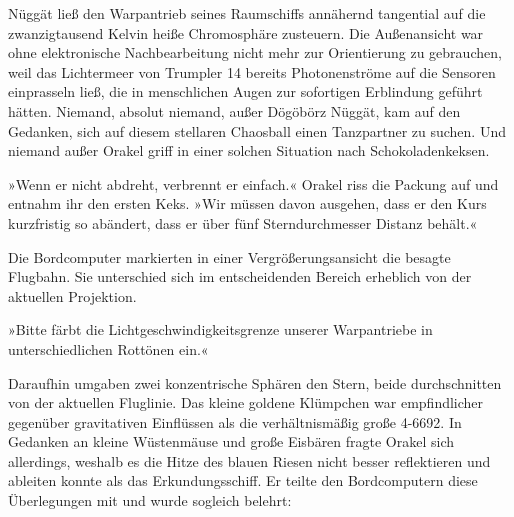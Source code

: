 Nüggät ließ den Warpantrieb seines Raumschiffs annähernd tangential auf die zwanzigtausend Kelvin heiße Chromosphäre zusteuern. Die Außenansicht war ohne elektronische Nachbearbeitung nicht mehr zur Orientierung zu gebrauchen, weil das Lichtermeer von Trumpler 14 bereits Photonenströme auf die Sensoren einprasseln ließ, die in menschlichen Augen zur sofortigen Erblindung geführt hätten. Niemand, absolut niemand, außer Dögöbörz Nüggät, kam auf den Gedanken, sich auf diesem stellaren Chaosball einen Tanzpartner zu suchen. Und niemand außer Orakel griff in einer solchen Situation nach Schokoladenkeksen.

»Wenn er nicht abdreht, verbrennt er einfach.« Orakel riss die Packung auf und entnahm ihr den ersten Keks. »Wir müssen davon ausgehen, dass er den Kurs kurzfristig so abändert, dass er über fünf Sterndurchmesser Distanz behält.«

Die Bordcomputer markierten in einer Vergrößerungsansicht die besagte Flugbahn. Sie unterschied sich im entscheidenden Bereich erheblich von der aktuellen Projektion.

»Bitte färbt die Lichtgeschwindigkeitsgrenze unserer Warpantriebe in unterschiedlichen Rottönen ein.«

Daraufhin umgaben zwei konzentrische Sphären den Stern, beide durchschnitten von der aktuellen Fluglinie. Das kleine goldene Klümpchen war empfindlicher gegenüber gravitativen Einflüssen als die verhältnismäßig große 4-6692. In Gedanken an kleine Wüstenmäuse und große Eisbären fragte Orakel sich allerdings, weshalb es die Hitze des blauen Riesen nicht besser reflektieren und ableiten konnte als das Erkundungsschiff. Er teilte den Bordcomputern diese Überlegungen mit und wurde sogleich belehrt:


